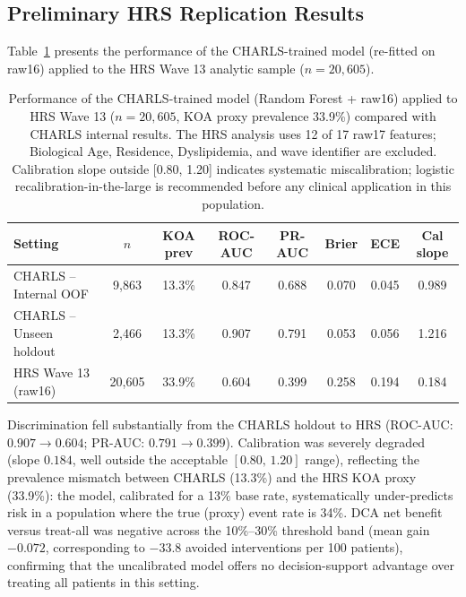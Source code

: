 \documentclass[11pt,a4paper]{article}
\begin{document}
\subsection{Preliminary HRS Replication Results}

Table~\ref{tab:hrs-metrics} presents the performance of the CHARLS-trained model (re-fitted on raw16)
applied to the HRS Wave 13 analytic sample ($n=20{,}605$).

\begin{table}[h!]
\centering
\small
\caption{Performance of the CHARLS-trained model (Random Forest + raw16) applied to HRS Wave 13
($n=20{,}605$, KOA proxy prevalence 33.9\%) compared with CHARLS internal results. The HRS
analysis uses 12 of 17 raw17 features; Biological Age, Residence, Dyslipidemia, and wave
identifier are excluded. Calibration slope outside [0.80, 1.20] indicates systematic miscalibration;
logistic recalibration-in-the-large is recommended before any clinical application in this
population.}
\label{tab:hrs-metrics}
\begin{tabular}{lccccccc}
\toprule
Setting & $n$ & KOA prev & ROC-AUC & PR-AUC & Brier & ECE & Cal slope \\
\midrule
CHARLS -- Internal OOF  & 9{,}863  & 13.3\% & 0.847 & 0.688 & 0.070 & 0.045 & 0.989 \\
CHARLS -- Unseen holdout & 2{,}466  & 13.3\% & 0.907 & 0.791 & 0.053 & 0.056 & 1.216 \\
\midrule
HRS Wave 13 (raw16) & 20{,}605 & 33.9\% & 0.604 & 0.399 & 0.258 & 0.194 & 0.184 \\
\bottomrule
\end{tabular}
\end{table}

Discrimination fell substantially from the CHARLS holdout to HRS
(ROC-AUC: $0.907 \rightarrow 0.604$; PR-AUC: $0.791 \rightarrow 0.399$). Calibration was severely
degraded (slope $0.184$, well outside the acceptable $[0.80,\,1.20]$ range), reflecting the
prevalence mismatch between CHARLS (13.3\%) and the HRS KOA proxy (33.9\%): the model, calibrated
for a 13\% base rate, systematically under-predicts risk in a population where the true (proxy) event
rate is 34\%. DCA net benefit versus treat-all was negative across the 10\%--30\% threshold band
(mean gain $-0.072$, corresponding to $-33.8$ avoided interventions per 100 patients), confirming
that the uncalibrated model offers no decision-support advantage over treating all patients in this
setting.
\end{document}
